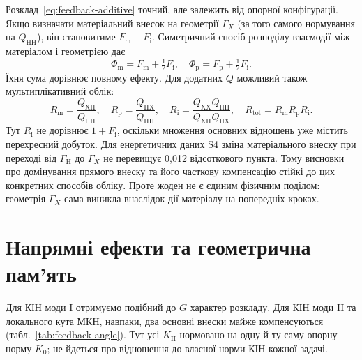 Розклад~\eqref{eq:feedback-additive} точний, але залежить від опорної конфігурації. Якщо визначати матеріальний внесок на геометрії $\Gamma_X$ (за того самого нормування на $Q_{\mathrm{HH}}$), він становитиме $F_{\mathrm m}+F_{\mathrm i}$. Симетричний спосіб розподілу взаємодії між матеріалом і геометрією дає
\begin{equation}
 \Phi_{\mathrm m}=F_{\mathrm m}+\tfrac12 F_{\mathrm i},
 \quad \Phi_{\mathrm p}=F_{\mathrm p}+\tfrac12 F_{\mathrm i}.
 \label{eq:feedback-shapley}
\end{equation}
Їхня сума дорівнює повному ефекту. Для додатних $Q$ можливий також мультиплікативний облік:
\begin{equation}
 R_{\mathrm m}=\frac{Q_{\mathrm{XH}}}{Q_{\mathrm{HH}}},
 \quad R_{\mathrm p}=\frac{Q_{\mathrm{HX}}}{Q_{\mathrm{HH}}},
 \quad R_{\mathrm i}=\frac{Q_{\mathrm{XX}}Q_{\mathrm{HH}}}
 {Q_{\mathrm{XH}}Q_{\mathrm{HX}}},
 \quad R_{\mathrm{tot}}=R_{\mathrm m}R_{\mathrm p}R_{\mathrm i}.
 \label{eq:feedback-mult}
\end{equation}
Тут $R_{\mathrm i}$ не дорівнює $1+F_{\mathrm i}$, оскільки множення основних відношень уже містить перехресний добуток. Для енергетичних даних S4 зміна матеріального внеску при переході від $\Gamma_{\mathrm H}$ до $\Gamma_X$ не перевищує 0,012 відсоткового пункта. Тому висновки про домінування прямого внеску та його часткову компенсацію стійкі до цих конкретних способів обліку. Проте жоден не є єдиним фізичним поділом: геометрія $\Gamma_X$ сама виникла внаслідок дії матеріалу на попередніх кроках.

\section{Напрямні ефекти та геометрична пам'ять}
\label{sec:feedback-direction}

Для КІН моди I отримуємо подібний до $G$ характер розкладу. Для КІН моди II та локального кута МКН, навпаки, два основні внески майже компенсуються (табл.~\ref{tab:feedback-angle}). Тут усі $K_{\mathrm{II}}$ нормовано на одну й ту саму опорну норму $K_0$; не йдеться про відношення до власної норми КІН кожної задачі.

